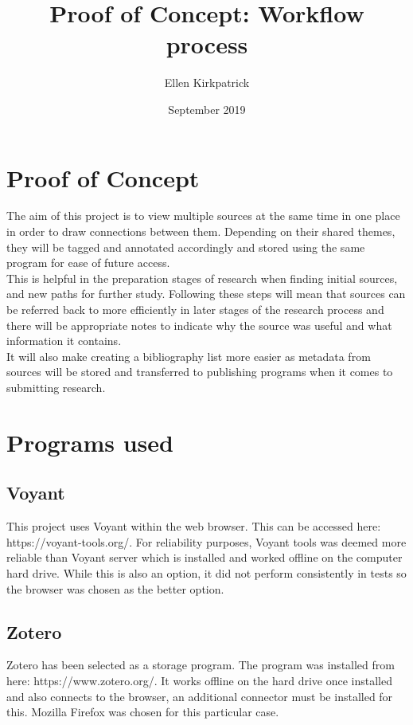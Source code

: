 \documentclass{article}
\title{Proof of Concept: Workflow process}
\author{Ellen Kirkpatrick }
\date{September 2019}
\begin{document}
\maketitle

\section{Proof of Concept}
The aim of this project is to view multiple sources at the same time in one place in order to draw connections between them. Depending on their shared themes, they will be tagged and annotated accordingly and stored using the same program for ease of future access.\\
This is helpful in the preparation stages of research when finding initial sources, and new paths for further study. Following these steps will mean that sources can be referred back to more efficiently in later stages of the research process and there will be appropriate notes to indicate why the source was useful and what information it contains.\\
It will also make creating a bibliography list more easier as metadata from sources will be stored and transferred to publishing programs when it comes to submitting research.

\section{Programs used}
\subsection{Voyant}
This project uses Voyant within the web browser. This can be accessed here: https://voyant-tools.org/. For reliability purposes, Voyant tools was deemed more reliable than Voyant server which is installed and worked offline on the computer hard drive. While this is also an option, it did not perform consistently in tests so the browser was chosen as the better option.
\subsection{Zotero}
Zotero has been selected as a storage program. The program was installed from here: https://www.zotero.org/. It works offline on the hard drive once installed and also connects to the browser, an additional connector must be installed for this. Mozilla Firefox was chosen for this particular case. 
\end{document}
